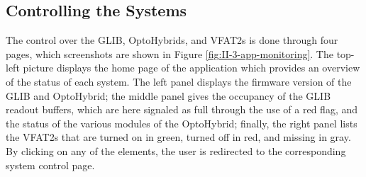     \subsection{Controlling the Systems}

      The control over the GLIB, OptoHybrids, and VFAT2s is done through four pages, which screenshots are shown in Figure \ref{fig:II-3-app-monitoring}. The top-left picture displays the home page of the application which provides an overview of the status of each system. The left panel displays the firmware version of the GLIB and OptoHybrid; the middle panel gives the occupancy of the GLIB readout buffers, which are here signaled as full through the use of a red flag, and the status of the various modules of the OptoHybrid; finally, the right panel lists the VFAT2s that are turned on in green, turned off in red, and missing in gray. By clicking on any of the elements, the user is redirected to the corresponding system control page. \\

